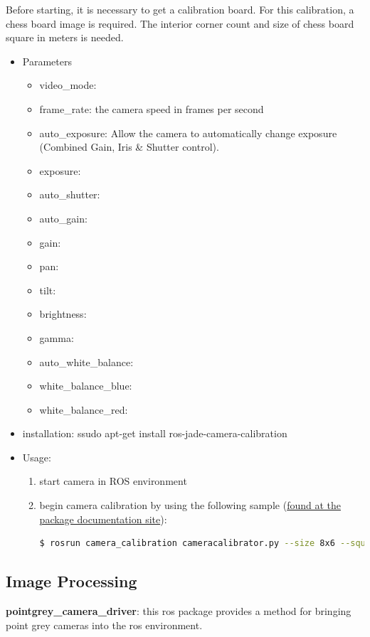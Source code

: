 \noindent Before starting, it is necessary to get a calibration board. For this calibration, a chess board image is required. The interior corner count and size of chess board square in meters is needed.
\begin{itemize}
\item Parameters
\begin{itemize}
\item video\_mode:
\item frame\_rate:  the camera speed in frames per second
\item auto\_exposure:  Allow the camera to automatically change exposure (Combined Gain, Iris \& Shutter control).
\item exposure: 
\item auto\_shutter:
\item auto\_gain:
\item gain:
\item pan:
\item tilt:
\item brightness:
\item gamma:
\item auto\_white\_balance:
\item white\_balance\_blue:
\item white\_balance\_red:
\end{itemize}
\item installation: ssudo apt-get install ros-jade-camera-calibration
\item Usage:
\begin{enumerate}
\item start camera in ROS environment
\item begin camera calibration by using the following sample (\href{http://wiki.ros.org/camera_calibration}{found at the package documentation site}):
\begin{lstlisting}[language=bash]
$ rosrun camera_calibration cameracalibrator.py --size 8x6 --square 0.108 image:=/my_camera/image camera:=/my_camera
\end{lstlisting}
\end{enumerate}
\end{itemize}

\subsection{Image Processing}
\noindent \textbf{pointgrey\_camera\_driver}: this ros package provides a method for bringing point grey cameras into the ros environment. 

